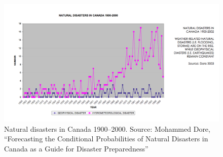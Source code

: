 \documentclass[10pt]{article}
\begin{document}
\begin{figure}
\includegraphics[width=160mm]{s3-canadadisasters.png}
\centering
\caption{Natural disasters in Canada 1900--2000. Source: Mohammed Dore, ``Forecasting the Conditional Probabilities of Natural Disasters in Canada as a Guide for Disaster Preparedness''}
\label{fig:s3-canadadisasters}
\end{figure}
\end{document}
